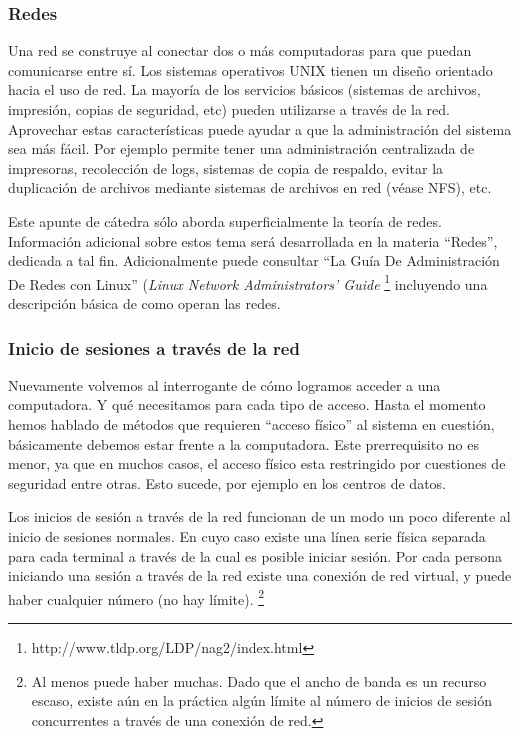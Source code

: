 \documentclass[12pt]{article}
\begin{document}
\subsubsection{Redes}

 Una red se construye al conectar dos o más computadoras para que puedan
comunicarse entre sí.  Los sistemas operativos UNIX tienen un diseño orientado 
hacia el uso 
de red. La mayoría de los servicios básicos (sistemas de archivos, impresión, 
copias de seguridad, etc) pueden utilizarse a través de la red. Aprovechar estas
características puede ayudar a que la administración del sistema sea más fácil. 
Por ejemplo permite tener una administración centralizada de impresoras, recolección 
de logs, sistemas de copia de respaldo, evitar la duplicación 
de archivos mediante sistemas de archivos en red (véase NFS), etc.

 Este apunte de cátedra sólo aborda superficialmente la teoría de
redes. Información adicional sobre estos tema será desarrollada en la materia 
``Redes'', dedicada a tal fin. Adicionalmente puede consultar ``La Guía De Administración 
De Redes con Linux'' (\textit{Linux Network Administrators' Guide} 
\footnote{http://www.tldp.org/LDP/nag2/index.html}
incluyendo una descripción básica de como
operan las redes.  

\subsubsection{Inicio de sesiones a través de la red}
Nuevamente volvemos al interrogante de cómo logramos acceder a una computadora. 
Y qué necesitamos para cada tipo de acceso. 
Hasta el momento hemos hablado de métodos que requieren ``acceso físico'' al 
sistema en cuestión, básicamente debemos estar frente a la computadora. Este
prerrequisito no es menor, ya que en muchos casos, el acceso físico esta 
restringido por cuestiones de seguridad entre otras. Esto sucede, por ejemplo
en los centros de datos.

 Los inicios de sesión a través de la red funcionan de un modo un poco
diferente al inicio de sesiones normales. En cuyo caso existe una línea serie 
física separada para cada terminal a través de la cual es posible iniciar sesión. 
Por cada persona iniciando una sesión a través de la red existe una conexión de red
virtual, y puede haber cualquier número (no hay límite).  
\footnote{Al menos puede haber muchas. Dado que el ancho de banda es un
recurso escaso, existe aún en la práctica algún límite al
número de inicios de sesión concurrentes a través de una conexión
de red. }
\end{document}
